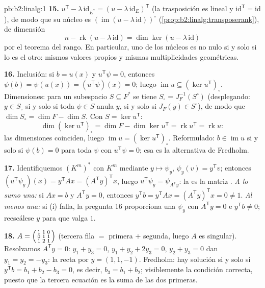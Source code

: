 \begin{solution}{pb:b2:linalg:1}
\textbf{15.} $u^{\mathsf T} - \lambda\,\mathrm{id}_{E^*} = (u -
\lambda\,\mathrm{id}_E)^{\mathsf T}$ (la trasposición es lineal y
$\mathrm{id}^{\mathsf T} = \mathrm{id}$), de modo que su núcleo es
$(\operatorname{im}(u - \lambda\,\mathrm{id}))^\circ$
(\cref{prop:b2:linalg:transposerank}), de dimensión
\[
n - \operatorname{rk}(u - \lambda\,\mathrm{id})
= \dim\ker(u - \lambda\,\mathrm{id})
\]
por el teorema del rango. En particular, uno de los núcleos es no
nulo si y solo si lo es el otro: mismos valores propios y mismas
multiplicidades geométricas.

\textbf{16.} Inclusión: si $b = u(x)$ y $u^{\mathsf T}\psi = 0$,
entonces $\psi(b) = \psi(u(x)) = (u^{\mathsf T}\psi)(x) = 0$;
luego $\operatorname{im} u \subseteq (\ker u^{\mathsf T})_\circ$.
Dimensiones: para un subespacio $S \subseteq F^*$ se tiene
$S_\circ = J_F^{-1}(S^\circ)$ (desplegando: $y \in S_\circ$ si y
solo si toda $\psi \in S$ anula $y$, si y solo si $J_F(y) \in
S^\circ$), de modo que $\dim S_\circ = \dim F - \dim S$. Con $S =
\ker u^{\mathsf T}$:
\[
\dim(\ker u^{\mathsf T})_\circ
= \dim F - \dim\ker u^{\mathsf T}
= \operatorname{rk} u^{\mathsf T} = \operatorname{rk} u :
\]
las dimensiones coinciden, luego $\operatorname{im} u = (\ker
u^{\mathsf T})_\circ$. Reformulado: $b \in \operatorname{im} u$ si
y solo si $\psi(b) = 0$ para toda $\psi$ con $u^{\mathsf T}\psi =
0$; esa es la alternativa de Fredholm.

\textbf{17.} Identifiquemos $(K^m)^*$ con $K^m$ mediante $y
\mapsto \psi_y$, $\psi_y(v) = y^{\mathsf T}v$; entonces
$(u^{\mathsf T}\psi_y)(x) = y^{\mathsf T}Ax = (A^{\mathsf
T}y)^{\mathsf T}x$, luego $u^{\mathsf T}\psi_y = \psi_{A^{\mathsf
T}y}$: la  es la matriz . \emph{A lo sumo
una:} si $Ax = b$ y $A^{\mathsf T}y = 0$, entonces $y^{\mathsf T}b
= y^{\mathsf T}Ax = (A^{\mathsf T}y)^{\mathsf T}x = 0 \neq 1$.
\emph{Al menos una:} si (i) falla, la pregunta 16 proporciona una
$\psi_y$ con $A^{\mathsf T}y = 0$ e $y^{\mathsf T}b \neq 0$;
reescálese $y$ para que valga $1$.

\textbf{18.} $A = \begin{psmallmatrix} 1 & 1 & 0\\ 0 & 1 & 1\\ 1 &
2 & 1\end{psmallmatrix}$ (tercera fila $=$ primera $+$ segunda,
luego $A$ es singular). Resolvamos $A^{\mathsf T}y = 0$: $y_1 +
y_3 = 0$, $y_1 + y_2 + 2y_3 = 0$, $y_2 + y_3 = 0$ dan $y_1 = y_2 =
-y_3$: la recta  por $y = (1, 1, -1)$. Fredholm: hay
solución si y solo si $y^{\mathsf T}b = b_1 + b_2 - b_3 = 0$, es
decir, $b_3 = b_1 + b_2$; visiblemente la condición correcta,
puesto que la tercera ecuación es la suma de las dos primeras.


\end{solution}
